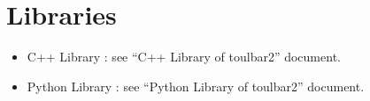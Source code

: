 \documentclass[letterpaper,10pt,openany,oneside,english]{sphinxmanual}
\begin{document}
\sphinxstepscope


\chapter{Libraries}
\label{\detokenize{ref/ref_lib:libraries}}\label{\detokenize{ref/ref_lib:ref-lib}}\label{\detokenize{ref/ref_lib::doc}}\begin{itemize}
\item {} 
\sphinxAtStartPar
C++ Library : see “C++ Library of toulbar2” document.

\item {} 
\sphinxAtStartPar
Python Library : see “Python Library of toulbar2” document.

\end{itemize}



\renewcommand{\indexname}{Index}
\printindex
\end{document}

